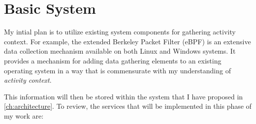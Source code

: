 \section{Basic System}
\label{plan:basic-system}

My intial plan is to utilize existing system components for gathering activity
context.  For example, the extended Berkeley Packet Filter (eBPF) is an
extensive data collection mechanism available on both Linux and Windows systems.
It provides a mechanism for adding data gathering elements to an existing
operating system in a way that is commensurate with my understanding of
\emph{activity context}.

This information will then be stored within the system that I have proposed in
\autoref{ch:architecture}.  To review, the services that will be implemented in this phase of my work are:

